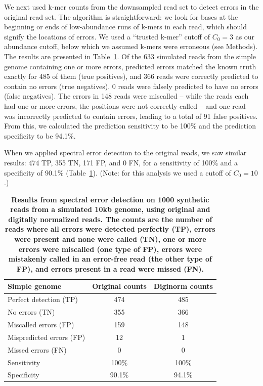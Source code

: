 \documentclass{article}
\begin{document}
We next used k-mer counts from the downsampled read set to detect
errors in the original read set.  The algorithm is straightforward: we
look for bases at the beginning or ends of low-abundance runs of
k-mers in each read, which should signify the locations of errors. We
used a ``trusted k-mer'' cutoff of $C_0 = 3$ as our abundance cutoff,
below which we assumed k-mers were erroneous (see Methods).  The
results are presented in Table~\ref{tab:a}.  Of the 633 simulated
reads from the simple genome containing one or more errors, predicted
errors matched the known truth exactly for 485 of them (true
positives), and 366 reads were correctly predicted to contain no
errors (true negatives). 0 reads were falsely predicted to have no
errors (false negatives). The errors in 148 reads were miscalled --
while the reads each had one or more errors, the positions were not
correctly called -- and one read was incorrectly predicted to
contain errors, leading to a total of 91 false positives.  From this,
we calculated the prediction sensitivity to be 100\% and the
prediction specificity to be 94.1\%.

When we applied spectral error detection to the original reads, we
saw similar results: 474 TP, 355 TN, 171 FP, and 0 FN, for a
sensitivity of 100\% and a specificity of 90.1\% (Table~\ref{tab:a}).
(Note: for this analysis we used a cutoff of $C_0=10$.)


\begin{table}
\centering

\begin{tabular}{|l|c|c|}
\hline
{\bf Simple genome} & Original counts & Diginorm counts \\
\hline
Perfect detection (TP) & 474 & 485 \\
No errors (TN) & 355 & 366 \\
Miscalled errors (FP) & 159 & 148 \\
Mispredicted errors (FP) & 12 & 1 \\
Missed errors (FN) & 0 & 0 \\
\hline
Sensitivity & 100\% & 100\% \\
Specificity & 90.1\% & 94.1\% \\
\hline
\end{tabular}

\caption{{\bf Results from spectral error detection on 1000 synthetic
    reads from a simulated 10kb genome, using original and digitally
    normalized reads.  The counts are the number of reads where all
    errors were detected perfectly (TP), errors were present and none
    were called (TN), one or more errors were miscalled (one type of
    FP), errors were mistakenly called in an error-free read (the
    other type of FP), and errors present in a read were missed
    (FN).}}
\label{tab:a}
\end{table}
\end{document}
